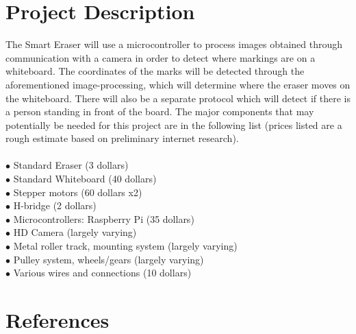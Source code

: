 \documentclass{IEEEtran}					%
\begin{document}
	\section{Project Description}
	The Smart Eraser will use a microcontroller to process images obtained through communication with a camera in order to detect where markings are on a whiteboard. The coordinates of the marks will be detected through the aforementioned image-processing, which will determine where the eraser moves on the whiteboard. There will also be a separate protocol which will detect if there is a person standing in front of the board. The major components that may potentially be needed for this project are in the following list (prices listed are a rough estimate based on preliminary internet research).\\\\
$\bullet$ Standard Eraser (3 dollars) \\
$\bullet$ Standard Whiteboard (40 dollars)\\
$\bullet$ Stepper motors (60 dollars x2)\\
$\bullet$ H-bridge (2 dollars)\\
$\bullet$ Microcontrollers: Raspberry Pi (35 dollars)\\
$\bullet$ HD Camera (largely varying)\\
$\bullet$ Metal roller track, mounting system (largely varying)\\
$\bullet$ Pulley system, wheels/gears (largely varying)\\
$\bullet$ Various wires and connections (10 dollars)\\

	
	\section*{References}
\end{document}
